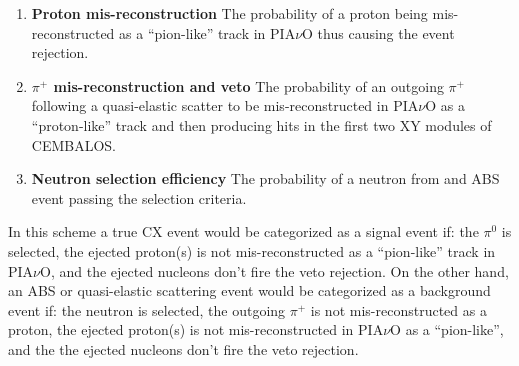 \begin{enumerate}
\item{{\bf Proton mis-reconstruction} The probability of a proton being mis-reconstructed as a ``pion-like'' track in PIA$\nu$O thus causing the event rejection.}
\item{{\bf $\pi^{+}$ mis-reconstruction and veto} The probability of an outgoing $\pi^{+}$ following a quasi-elastic scatter to be mis-reconstructed in PIA$\nu$O as a ``proton-like'' track and then producing hits in the first two XY modules of CEMBALOS.}
\item{{\bf Neutron selection efficiency} The probability of a neutron from and ABS event passing the selection criteria.}
\end{enumerate}

In this scheme a true CX event would be categorized as a signal event if: the $\pi^{0}$ is selected, the ejected proton(s) is not mis-reconstructed as a ``pion-like'' track in PIA$\nu$O, and the ejected nucleons don't fire the veto rejection. On the other hand, an ABS or quasi-elastic scattering event would be categorized as a background event if: the neutron is selected, the outgoing $\pi^{+}$ is not mis-reconstructed as a proton, the ejected proton(s) is not mis-reconstructed in PIA$\nu$O as a ``pion-like'', and the the ejected nucleons don't fire the veto rejection. 

